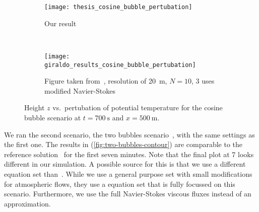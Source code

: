\begin{figure}[htb]
  \centering
  \begin{subfigure}[t]{0.5\textwidth}
    \centering
    \texttt{[image: thesis\_cosine\_bubble\_pertubation]}
    \caption{\label{fig:cosine-bubble-potT-ours}%
      Our result}
  \end{subfigure}~%
  \begin{subfigure}[t]{0.5\textwidth}
    \centering
    \texttt{[image: giraldo\_results\_cosine\_bubble\_pertubation]}
    \caption{\label{fig:cosine-bubble-potT-giraldo}%
      Figure taken from~\cite{giraldo2008study}, resolution of \SI{20}{\m}, $N = 10$, \dg{}3 uses modified Navier-Stokes} %
  \end{subfigure}
  \caption{\label{fig:cosine-bubble-potT}%
    Height $z$ vs.\ pertubation of potential temperature for the cosine bubble scenario at $t=\SI{700}{\s}$ and $x = \SI{500}{\m}$.
  }
\end{figure}

We ran the second scenario, the two bubbles scenario~, with the same \amr{} settings as the first one.
The results in (\cref{fig:two-bubbles-contour}) are comparable to the reference solution~\cite{muller2010adaptive} for the first seven minutes.
Note that the final plot at \SI{7}{\min} looks different in our simulation.
A possible source for this is that we use a different equation set than~\cite{muller2010adaptive}.
While we use a general purpose set with small modifications for atmospheric flows, they use a equation set that is fully focussed on this scenario.
Furthermore, we use the full Navier-Stokes viscous fluxes instead of an approximation.


